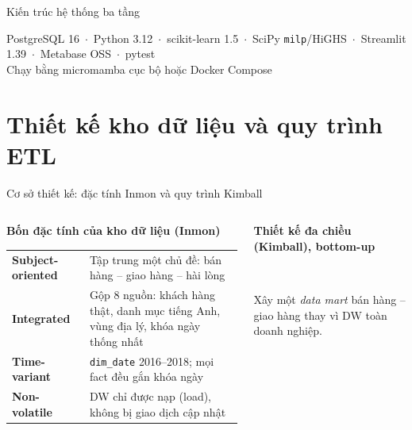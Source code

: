 \documentclass[aspectratio=169,10pt,xcolor=table]{beamer}
\newcommand{\presenter}{}
\newcommand{\setpresenter}[1]{\renewcommand{\presenter}{#1}}
\begin{document}
\begin{frame}{Kiến trúc hệ thống ba tầng}
  \vspace{0.1cm}
  {\scriptsize\color{muted}PostgreSQL 16 \,$\cdot$\, Python 3.12 \,$\cdot$\, scikit-learn 1.5 \,$\cdot$\, SciPy \texttt{milp}/HiGHS \,$\cdot$\, Streamlit 1.39 \,$\cdot$\, Metabase OSS \,$\cdot$\, pytest\\ Chạy bằng micromamba cục bộ hoặc Docker Compose\par}
\end{frame}

\setpresenter{Tạ Tiến Tài}
\section{Thiết kế kho dữ liệu và quy trình ETL}

\begin{frame}{Cơ sở thiết kế: đặc tính Inmon và quy trình Kimball}
  \begin{columns}[T]
    \begin{column}{0.56\textwidth}
      \textbf{\small Bốn đặc tính của kho dữ liệu (Inmon)}\\[0.15cm]
      \footnotesize
      \renewcommand{\arraystretch}{1.25}
      \begin{tabular}{@{}P{2.2cm}P{5.6cm}@{}}
        \toprule
        \textbf{Subject-oriented} & Tập trung một chủ đề: bán hàng -- giao hàng -- hài lòng\\
        \textbf{Integrated} & Gộp 8 nguồn: khách hàng thật, danh mục tiếng Anh, vùng địa lý, khóa ngày thống nhất\\
        \textbf{Time-variant} & \texttt{dim\_date} 2016--2018; mọi fact đều gắn khóa ngày\\
        \textbf{Non-volatile} & DW chỉ được nạp (load), không bị giao dịch cập nhật\\
        \bottomrule
      \end{tabular}
    \end{column}
    \begin{column}{0.4\textwidth}
      \textbf{\small Thiết kế đa chiều (Kimball), bottom-up}\\[0.2cm]
      \\[0.15cm]
      {\scriptsize Xây một \emph{data mart} bán hàng -- giao hàng thay vì DW toàn doanh nghiệp.\par}
    \end{column}
  \end{columns}
\end{frame}
\end{document}
